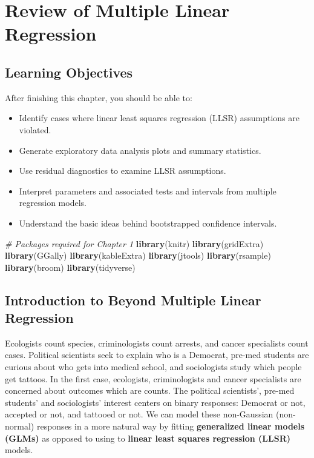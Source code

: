 \documentclass[
]{krantz}
\newenvironment{Shaded}{\begin{snugshade}}{\end{snugshade}}
\newcommand{\CommentTok}[1]{\textcolor[rgb]{0.37,0.37,0.37}{\textit{#1}}}
\newcommand{\KeywordTok}[1]{\textcolor[rgb]{0.27,0.27,0.27}{\textbf{#1}}}
\newcommand{\NormalTok}[1]{#1}
\providecommand{\tightlist}{%
  \setlength{\itemsep}{0pt}\setlength{\parskip}{0pt}}
\begin{document}
\hypertarget{ch-MLRreview}{%
\chapter{Review of Multiple Linear Regression}\label{ch-MLRreview}}

\hypertarget{learning-objectives}{%
\section{Learning Objectives}\label{learning-objectives}}

After finishing this chapter, you should be able to:

\begin{itemize}
\tightlist
\item
  Identify cases where linear least squares regression (LLSR) assumptions are violated.
\item
  Generate exploratory data analysis plots and summary statistics.
\item
  Use residual diagnostics to examine LLSR assumptions.
\item
  Interpret parameters and associated tests and intervals from multiple regression models.
\item
  Understand the basic ideas behind bootstrapped confidence intervals.
\end{itemize}

\begin{Shaded}
\begin{Highlighting}[]
\CommentTok{# Packages required for Chapter 1}
\KeywordTok{library}\NormalTok{(knitr) }
\KeywordTok{library}\NormalTok{(gridExtra)}
\KeywordTok{library}\NormalTok{(GGally)}
\KeywordTok{library}\NormalTok{(kableExtra)}
\KeywordTok{library}\NormalTok{(jtools)}
\KeywordTok{library}\NormalTok{(rsample)}
\KeywordTok{library}\NormalTok{(broom)}
\KeywordTok{library}\NormalTok{(tidyverse)    }
\end{Highlighting}
\end{Shaded}

\hypertarget{introduction-to-beyond-multiple-linear-regression}{%
\section{Introduction to Beyond Multiple Linear Regression}\label{introduction-to-beyond-multiple-linear-regression}}

Ecologists count species, criminologists count arrests, and cancer specialists count cases. Political scientists seek to explain who is a Democrat, pre-med students are curious about who gets into medical school, and sociologists study which people get tattoos. In the first case, ecologists, criminologists and cancer specialists are concerned about outcomes which are counts. The political scientists', pre-med students' and sociologists' interest centers on binary responses: Democrat or not, accepted or not, and tattooed or not. We can model these non-Gaussian (non-normal) responses in a more natural way by fitting \textbf{generalized linear models (GLMs)} as opposed to using to \textbf{linear least squares regression (LLSR)} models.
\end{document}
